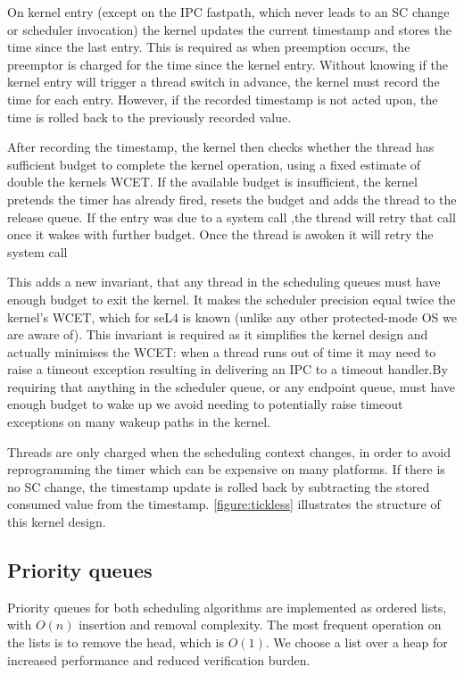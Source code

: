 On kernel entry (except on the IPC fastpath, which never leads to an SC
change or scheduler invocation) the kernel updates the current
timestamp and stores the time since the last entry. This is required as when preemption occurs, the
preemptor is charged for the time since the kernel entry. Without knowing if the kernel entry will
trigger a thread switch in advance, the kernel must record the time for each entry. However, if the
recorded timestamp is not acted upon, the time is rolled back to the previously recorded value.

After recording the timestamp, the kernel then checks
whether the thread has sufficient budget to complete the kernel
operation, using a fixed estimate of double the kernels \gls{WCET}.
If the available budget is insufficient, the kernel pretends the timer has already fired,
resets the budget and adds the thread to the release queue. If the entry was due to a system call
,the thread will retry that call once it wakes with further budget.
Once the thread is awoken it will retry the system call

This adds a new
invariant, that any thread in the scheduling queues must have enough budget to exit the kernel.
It makes the scheduler precision equal twice the kernel's WCET, which for
seL4 is known (unlike any other protected-mode OS we are aware of).
This invariant is required as it simplifies the kernel design and actually minimises the WCET: when
a
thread runs out of time it may need to raise a timeout exception resulting in delivering an IPC to a
timeout handler.By requiring that anything in the scheduler queue, or any endpoint queue, must have
enough budget to wake up we avoid needing to potentially raise timeout exceptions on many wakeup
paths in the kernel.

Threads are only charged when the scheduling context changes, in order to avoid
reprogramming the timer which can be expensive on many platforms. %
If there is no SC change, the timestamp update is rolled back by subtracting the
stored consumed value from the timestamp.
\autoref{figure:tickless} illustrates the structure of this kernel design.

\subsection{Priority queues}

Priority queues for both scheduling algorithms are implemented as ordered lists, with $O(n)$ insertion and removal complexity.
The most frequent operation on the lists is to remove the head, which is $O(1)$.
We choose a list over a heap for increased performance and reduced verification burden.

